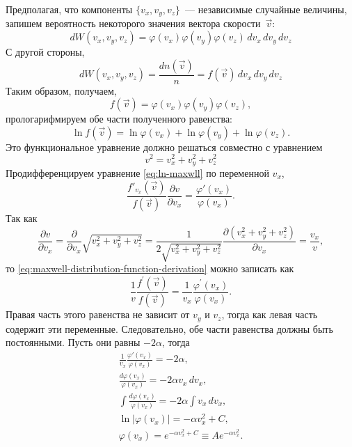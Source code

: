 Предполагая, что компоненты $\{v_x, v_y, v_z\}$~--- независимые случайные величины, запишем вероятность некоторого значения вектора скорости~$\vec{v}$:
\begin{equation*}
	d W(v_x, v_y, v_z)
	   = \varphi(v_x) \varphi(v_y) \varphi(v_z) \,d v_x \, d v_y \, d v_z
\end{equation*}
С другой стороны,
\begin{equation*}
	d W\left(v_x, v_y, v_z\right)
	   = \frac{d n(\vec{v})}{n} = f(\vec{v}) \, d v_x \,d v_y \,d v_z
\end{equation*}
Таким образом, получаем,
\begin{equation*}
	f(\vec{v}) = \varphi(v_x) \varphi(v_y) \varphi(v_z),
\end{equation*}
прологарифмируем обе части полученного равенства:
\begin{equation}
    \ln f(\vec{v}) = \ln \varphi(v_x) + \ln \varphi(v_y) + \ln \varphi(v_z).
    \label{eq:ln-maxwll}
\end{equation}
Это функциональное уравнение должно решаться совместно с уравнением
\begin{equation*}
    v^2 = v_x^2 + v_y^2 + v_z^2
\end{equation*}
Продифференцируем уравнение \eqref{eq:ln-maxwll} по переменной $v_x$,
\begin{equation}
    \frac{f'_{v_x}(\vec{v})}{f(\vec{v})} \frac{\partial v}{\partial v_x}
        = \frac{\varphi'(v_x)}{\varphi(v_x)}.
    \label{eq:maxwell-distribution-function-derivation}
\end{equation}
Так как
\begin{equation*}
    \frac{\partial v}{\partial v_x}
        = \frac{\partial}{\partial v_x} \sqrt{v_x^2+v_y^2+v_z^2}
        = \frac{1}{2\sqrt{v_x^2+v_y^2+v_z^2}} \frac{\partial(v_x^2+v_y^2+v_z^2)}{\partial v_x}
        = \frac{v_x}{v},
\end{equation*}
то \eqref{eq:maxwell-distribution-function-derivation} можно записать как
\begin{equation*}
\frac{1}{v} \frac{f^{\prime}(\vec{v})}{f(\vec{v})}=\frac{1}{v_x} \frac{\varphi^{\prime}\left(v_x\right)}{\varphi\left(v_x\right)}.
\end{equation*}
Правая часть этого равенства не зависит от $v_y$ и $v_z$, тогда как левая часть содержит эти переменные. Следовательно, обе части равенства должны быть постоянными. Пусть они равны $-2\alpha$, тогда
\begin{gather*}
	\frac{1}{v_x} \frac{\varphi'(v_x)}{\varphi(v_x)} = -2 \alpha,\\
	\frac{d\varphi(v_x)}{\varphi(v_x)} = -2\alpha v_x \, dv_x,\\
	\int \frac{d\varphi(v_x)}{\varphi(v_x)} = -2\alpha \int v_x \, dv_x,\\
	\ln |\varphi(v_x)| = -\alpha v_x^2 + C,\\
	\varphi(v_x) = e^{-\alpha v_x^2 + C} \equiv A e^{-\alpha v_x^2}.
\end{gather*}
